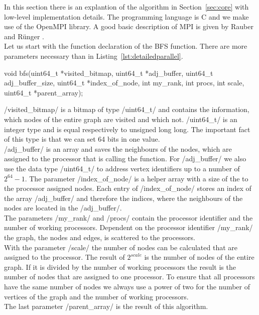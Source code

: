 \documentclass[12pt,a4paper]{article}
\begin{document}
In this section there is an explantion of the algorithm in Section~\ref{sec:core} with low-level implementation details. The programming language is C and we make use of the OpenMPI library. A good basic description of MPI is given by Rauber and R{\"u}nger \cite{rauber}. \\
Let us start with the function declaration of the BFS function. There are more parameters necessary than in Listing~\ref{lst:detailedparallel}.
\begin{ccode}
void bfs(uint64_t *visited_bitmap, uint64_t *adj_buffer, uint64_t adj_buffer_size, uint64_t *index_of_node, int my_rank, int procs, int scale, uint64_t *parent_array);
\end{ccode}
\cinline/visited_bitmap/ is a bitmap of type \cinline/uint64_t/ and contains the information, which nodes of the entire graph are visited and which not. \cinline/uint64_t/ is an integer type and is equal respectively to unsigned long long. The important fact of this type is that we can set 64 bits in one value. \\ 
\cinline/adj_buffer/ is an array and saves the neighbours of the nodes, which are assigned to the processor that is calling the function. For \cinline/adj_buffer/ we also use the data type \cinline/uint64_t/ to address vertex identifiers up to a number of \(2^{64}-1\). The parameter \cinline/index_of_node/ is a helper array with a size of the to the processor assigned nodes. Each entry of \cinline/index_of_node/ stores an index of the array \cinline/adj_buffer/ and therefore the indices, where the neighbours of the nodes are located in the \cinline/adj_buffer/. \\
The parameters \cinline/my_rank/ and \cinline/procs/ contain the processor identifier and the number of working processors. Dependent on the processor identifier \cinline/my_rank/ the graph, the nodes and edges, is scattered to the processors.\\
With the parameter \cinline/scale/ the number of nodes can be calculated that are assigned to the processor. The result of \(2^{scale}\) is the number of nodes of the entire graph. If it is divided by the number of working processors the result is the number of nodes that are assigned to one processor. To ensure that all processors have the same number of nodes we always use a power of two for the number of vertices of the graph and the number of working processors. \\
The last parameter \cinline/parent_array/ is the result of this algorithm. \\
\end{document}
